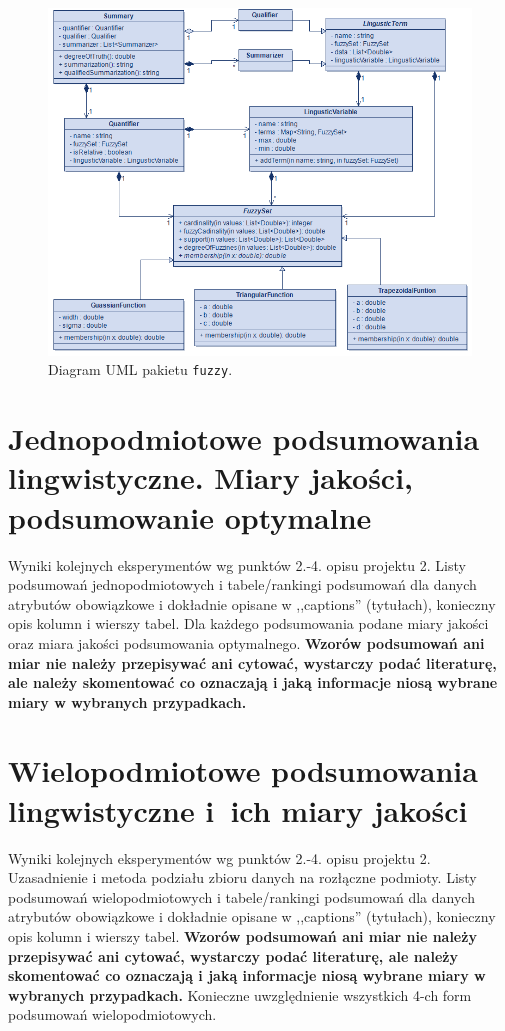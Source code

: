 \documentclass{article}
\begin{document}
\begin{figure}[H]
\centering
\includegraphics[width=\textwidth]{img/lingustic.png}
\caption{Diagram UML pakietu \texttt{fuzzy}.}
\end{figure}


\section{ Jednopodmiotowe podsumowania lingwistyczne. Miary jakości, podsumowanie optymalne}
Wyniki kolejnych eksperymentów wg punktów 2.-4. opisu projektu 2.  Listy podsumowań
jednopodmiotowych i tabele/rankingi podsumowań dla danych atrybutów obowiązkowe i dokładnie opisane w ,,captions'' (tytułach), konieczny opis kolumn i wierszy tabel. Dla każdego podsumowania podane miary jakości oraz miara jakości podsumowania
optymalnego. {\bf Wzorów podsumowań ani miar nie należy przepisywać ani cytować, wystarczy podać literaturę, ale
należy skomentować co oznaczają i jaką informacje niosą wybrane miary w wybranych
przypadkach.}\\

\section{Wielopodmiotowe podsumowania lingwistyczne i~ich miary jakości} 
Wyniki kolejnych eksperymentów wg punktów 2.-4. opisu projektu 2. Uzasadnienie i
metoda podziału zbioru danych na rozłączne podmioty. Listy podsumowań
wielopodmiotowych i tabele/rankingi podsumowań dla danych atrybutów obowiązkowe i
dokładnie opisane w ,,captions'' (tytułach), konieczny opis kolumn i wierszy tabel.
{\bf Wzorów podsumowań ani miar nie należy przepisywać ani cytować, wystarczy podać literaturę, ale
należy skomentować co oznaczają i jaką informacje niosą wybrane miary w wybranych
przypadkach.} Konieczne uwzględnienie wszystkich 4-ch form podsumowań wielopodmiotowych. 
\\ 
\end{document}
